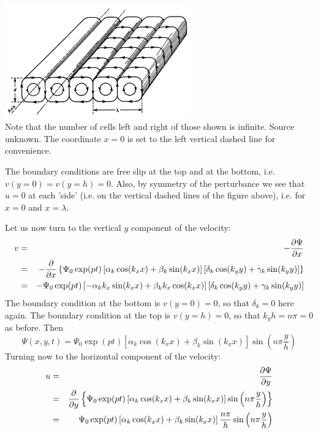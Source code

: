 \begin{center}
\includegraphics[width=8cm]{images/chapter_md/RBcells}\\
{\captionfont Note that the number of cells left and right of those shown is infinite.
Source unknown. The coordinate $x=0$ is set to the left vertical dashed line 
for convenience.}
\end{center}

The boundary conditions are free slip at the top and at the bottom, i.e.
$v(y=0)=v(y=h)=0$.
Also, by symmetry of the perturbance we see that $u=0$ at each 'side' (i.e.
on the vertical dashed lines of the figure above), 
i.e. for $x=0$ and $x=\lambda$.

Let us now turn to the vertical $y$ component of the velocity:
\begin{eqnarray}
v 
&=& -\frac{\partial \Psi}{\partial x}  \nonumber\\
&=& -\frac{\partial }{\partial x} 
\left\{
\Psi_0 \exp(pt) 
\left[\alpha_k \cos(k_x x) + \beta_k \sin(k_x x) \right]
\left[\delta_k \cos(k_y y) + \gamma_k \sin(k_y y) \right] 
\right\}
\nonumber\\
&=& - \Psi_0 \exp(pt) 
\left[- \alpha_k k_x \sin(k_x x) + \beta_k k_x \cos(k_x x) \right]
\left[\delta_k \cos(k_y y) + \gamma_k \sin(k_y y) \right] 
\end{eqnarray}
The boundary condition at the bottom is $v(y=0)=0$, so that $\delta_k=0$ here again.
The boundary condition at the top is $v(y=h)=0$, so that $k_y h = n \pi=0$ as before.
Then 
\[
\Psi(x,y,t) = 
\Psi_0 \exp(pt) 
\left[\alpha_k \cos(k_x x) + \beta_k \sin(k_x x) \right]
\sin \left( n \pi \frac{y}{h} \right)
\]
Turning now to the horizontal component of the velocity:
\begin{eqnarray}
u 
&=& \frac{\partial \Psi}{\partial y}  \nonumber\\
&=& \frac{\partial }{\partial y}  
\left\{
\Psi_0 \exp(pt) 
\left[\alpha_k \cos(k_x x) + \beta_k \sin(k_x x) \right]
\sin \left( n \pi \frac{y}{h} \right)
\right\}
\nonumber\\
&=&
\Psi_0 \exp(pt) 
\left[\alpha_k \cos(k_x x) + \beta_k \sin(k_x x) \right]
\frac{n \pi}{h}\sin \left( n \pi \frac{y}{h} \right)
\end{eqnarray}

